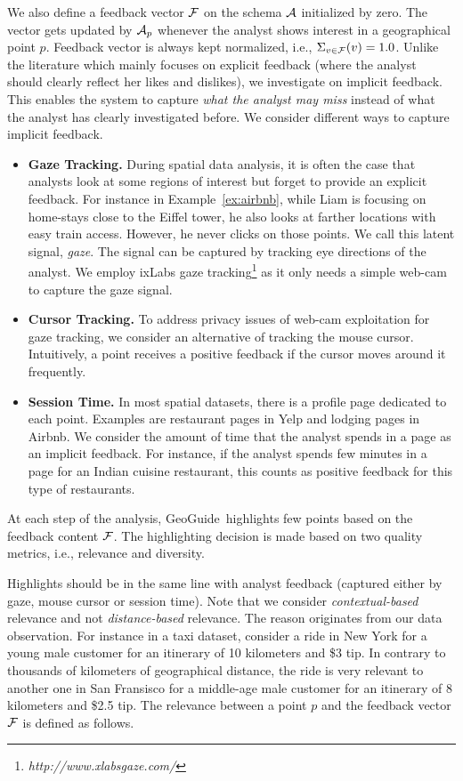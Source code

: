\documentclass{vldb}
\newcommand{\framework}{{\sc GeoGuide}}
\begin{document}
We also define a feedback vector ${\cal F}$ on the schema ${\cal A}$ initialized by zero. The vector gets updated by ${\cal A}_p$ whenever the analyst shows interest in a geographical point $p$. Feedback vector is always kept normalized, i.e., $\Sigma_{v \in {\cal F}}(v) = 1.0$. Unlike the literature which mainly focuses on explicit feedback (where the analyst should clearly reflect her likes and dislikes), we investigate on implicit feedback. This enables the system to capture {\em what the analyst may miss} instead of what the analyst has clearly investigated before. We consider different ways to capture implicit feedback.

\begin{itemize}[leftmargin=*]
\item {\bf Gaze Tracking.} During spatial data analysis, it is often the case that analysts look at some regions of interest but forget to provide an explicit feedback. For instance in Example~\ref{ex:airbnb}, while Liam is focusing on home-stays close to the Eiffel tower, he also looks at farther locations with easy train access. However, he never clicks on those points. We call this latent signal, {\em gaze}. The signal can be captured by tracking eye directions of the analyst. We employ {\sc ixLabs} gaze tracking\footnote{\em http://www.xlabsgaze.com/} as it only needs a simple web-cam to capture the gaze signal.
\item {\bf Cursor Tracking.} To address privacy issues of web-cam exploitation for gaze tracking, we consider an alternative of tracking the mouse cursor. Intuitively, a point receives a positive feedback if the cursor moves around it frequently.
\item {\bf Session Time.} In most spatial datasets, there is a profile page dedicated to each point. Examples are restaurant pages in Yelp and lodging pages in Airbnb. We consider the amount of time that the analyst spends in a page as an implicit feedback. For instance, if the analyst spends few minutes in a page for an Indian cuisine restaurant, this counts as positive feedback for this type of restaurants. 
\end{itemize}

At each step of the analysis, \framework\ highlights few points based on the feedback content ${\cal F}$. The highlighting decision is made based on two quality metrics, i.e., relevance and diversity. 

\vspace{5pt}
 Highlights should be in the same line with analyst feedback (captured either by gaze, mouse cursor or session time). Note that we consider {\em contextual-based} relevance and not {\em distance-based} relevance. The reason originates from our data observation. For instance in a taxi dataset, consider a ride in New York for a young male customer for an itinerary of 10 kilometers and \$3 tip. In contrary to thousands of kilometers of geographical distance, the ride is very relevant to another one in San Fransisco for a middle-age male customer for an itinerary of 8 kilometers and \$2.5 tip. The relevance between a point $p$ and the feedback vector ${\cal F}$ is defined as follows.
\end{document}
